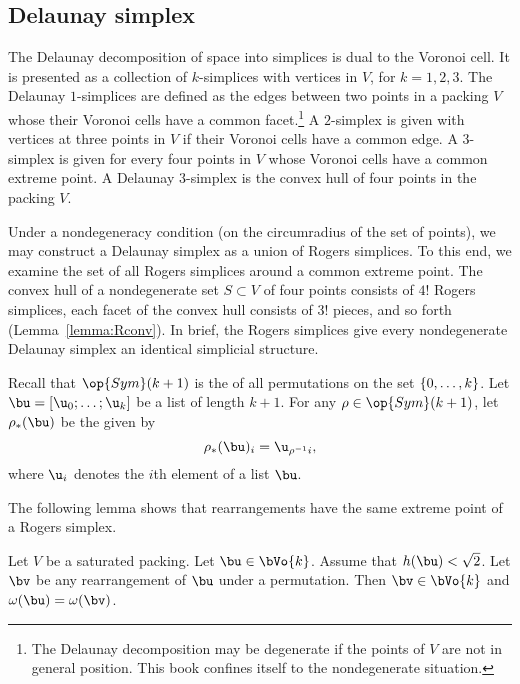\begin{cnl}
\subsection{Delaunay simplex}\label{Delaunay simplex}

The Delaunay decomposition of space into simplices is dual to the
Voronoi cell.  It is presented as a collection of $k$-simplices with
vertices in $V$, for $k=1,2,3$.  The Delaunay $1$-simplices are
defined as the edges between two points in a packing $V$ whose their
Voronoi cells have a common facet.\footnote{The Delaunay decomposition
  may be degenerate if the points of $V$ are not in general position.
  This book confines itself to the nondegenerate situation.}  A
$2$-simplex is given with vertices at three points in $V$ if their
Voronoi cells have a common edge.  A $3$-simplex is given for every
four points in $V$ whose Voronoi cells have a common extreme point.  A
Delaunay $3$-simplex is the convex hull of four points in the packing
$V$.

Under a nondegeneracy condition (on the circumradius of the set of
points), we may construct a Delaunay simplex as a union of Rogers
simplices.  To this end, we examine the set of all Rogers simplices
around a common extreme point.  The convex hull of a nondegenerate set
$S\subset V$ of four points consists of $4!$ Rogers simplices,  each
facet of the convex hull consists of $3!$ pieces,  and so
forth  (Lemma~\ref{lemma:Rconv}).  
In brief, the Rogers simplices give every nondegenerate
Delaunay simplex an identical simplicial structure.
%

Recall that $\op{Sym}(k+1)$ is the  of all permutations
on the set $\{0,\ldots,k\}$.  Let $\bu = \listdots{\u}{0}{k}$ be a
list of length $k+1$.  For any 
$\rho\in\op{Sym}(k+1)$, let $\rho_*(\bu)$ be the 
given by
\[  
\rho_*(\bu)_i =  \u_{\rho^{-1} i}, %
\]    
where $\u_i$ denotes the $i$th element of a list $\bu$.
%
%
%
%

The following lemma shows that rearrangements have the same extreme
point of a Rogers simplex.

\begin{lemma}
\label{lemma:perm-Vk} 
%
Let $V$ be a saturated packing.  Let $\bu\in \bVo{k}$.  Assume that
$h(\bu)<\sqrt2$. Let $\bv$ be any rearrangement of $\bu$ under a
permutation.  Then $\bv\in \bVo{k}$ and $\omega(\bu) = \omega(\bv)$.
\end{lemma}


\end{cnl}
